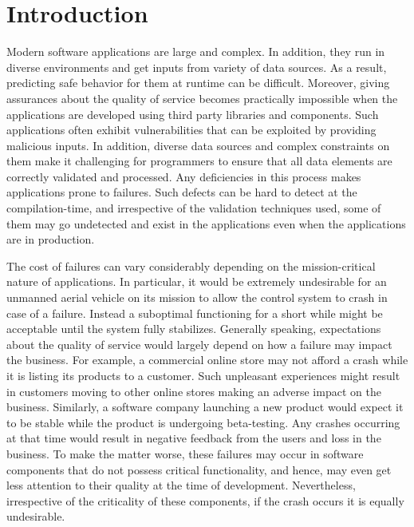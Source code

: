 \section{Introduction}
\label{sec:intro}



Modern software applications are large and complex. In addition, they run in
diverse environments and get inputs from variety of data sources. As a result,
predicting safe behavior for them at runtime can be difficult.
Moreover, giving assurances about the quality of service becomes practically
impossible when the applications are developed using third party
libraries and components. Such applications often exhibit vulnerabilities that
can be exploited by providing malicious inputs. In addition, diverse data sources
and complex constraints on them make it challenging for programmers to ensure
that all data elements are correctly validated and processed. Any deficiencies
in this process makes applications prone to failures. Such defects can be hard
to detect at the compilation-time, and irrespective of the validation techniques
used, some of them may go undetected and exist in the applications even when the
applications are in production.

The cost of failures can vary considerably depending on the mission-critical
nature of applications. In particular, it would be extremely undesirable for an
unmanned aerial vehicle on its mission to allow the control system to crash in
case of a failure. Instead a suboptimal functioning for a short while might be
acceptable until the system fully stabilizes.
Generally speaking, expectations about the quality of service would largely
depend on how a failure may impact the business. For example, a commercial
online store may not afford a crash while it is listing its products to a
customer. Such unpleasant experiences might result in customers moving to other
online stores making an adverse impact on the business. Similarly, a software
company launching a new product would expect it to be stable while the product
is undergoing beta-testing. Any crashes occurring at that time would result in
negative feedback from the users and loss in the business. To make the matter worse, these
failures may occur in software components that do not possess critical
functionality, and hence, may even get less attention to their quality at the
time of development. Nevertheless, irrespective of the criticality of these
components, if the crash occurs it is equally undesirable.

